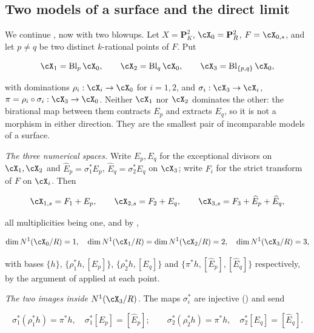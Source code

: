 \subsection{Two models of a surface and the direct limit}
\label{sec:ch20-ex-two-model}

\begin{example}
\label{ex:ch20-two-model-surface}
We continue , now with two blowups.  Let
\(X=\mathbf P^2_K\), \(\cX_0=\mathbf P^2_R\), \(F=\cX_{0,s}\), and let
\(p\neq q\) be two distinct \(k\)-rational points of \(F\).  Put

\[
 \cX_1=\operatorname{Bl}_p\cX_0,\qquad
 \cX_2=\operatorname{Bl}_q\cX_0,\qquad
 \cX_3=\operatorname{Bl}_{\{p,q\}}\cX_0 ,
\]

with dominations \(\rho_i:\cX_i\to\cX_0\) for \(i=1,2\), and
\(\sigma_i:\cX_3\to\cX_i\), \(\pi=\rho_i\circ\sigma_i:\cX_3\to\cX_0\).
Neither \(\cX_1\) nor \(\cX_2\) dominates the other: the birational map
between them contracts \(E_p\) and extracts \(E_q\), so it is not a
morphism in either direction.  They are the smallest pair of incomparable
models of a surface.

\emph{The three numerical spaces.}  Write \(E_p,E_q\) for the exceptional
divisors on \(\cX_1,\cX_2\) and \(\widehat E_p=\sigma_1^*E_p\),
\(\widehat E_q=\sigma_2^*E_q\) on \(\cX_3\); write \(F_i\) for the strict
transform of \(F\) on \(\cX_i\).  Then

\[
 \cX_{1,s}=F_1+E_p,\qquad
 \cX_{2,s}=F_2+E_q,\qquad
 \cX_{3,s}=F_3+\widehat E_p+\widehat E_q ,
\]

all multiplicities being one, and by ,

\begin{equation}
\label{eq:ch20-two-model-dimensions}
 \dim N^1(\cX_0/R)=1,\quad
 \dim N^1(\cX_1/R)=\dim N^1(\cX_2/R)=2,\quad
 \dim N^1(\cX_3/R)=3 ,
\end{equation}

with bases \(\{h\}\), \(\{\rho_1^*h,[E_p]\}\), \(\{\rho_2^*h,[E_q]\}\) and
\(\{\pi^*h,[\widehat E_p],[\widehat E_q]\}\) respectively, by the argument
of  applied at each point.

\emph{The two images inside \(N^1(\cX_3/R)\).}  The maps \(\sigma_i^*\) are
injective () and send

\[
 \sigma_1^*(\rho_1^*h)=\pi^*h,\quad
 \sigma_1^*[E_p]=[\widehat E_p];
 \qquad
 \sigma_2^*(\rho_2^*h)=\pi^*h,\quad
 \sigma_2^*[E_q]=[\widehat E_q].
\]


\end{example}
